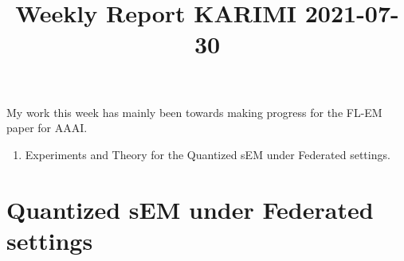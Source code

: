 \documentclass{article}
\begin{document}
\title{Weekly Report KARIMI 2021-07-30}


\date{}
\maketitle

\vspace{-0.5in}

My work this week has mainly been towards making progress for the FL-EM paper for AAAI.
\begin{enumerate}
\item Experiments and Theory for the Quantized sEM under Federated settings.
\end{enumerate}


\section{Quantized sEM under Federated settings}







\end{document}
